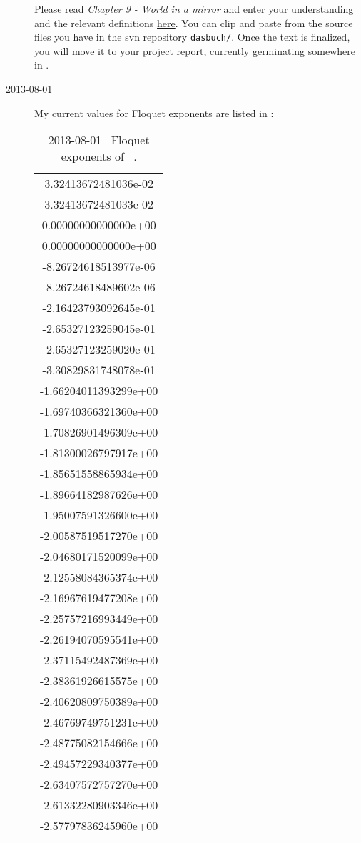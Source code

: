 \begin{description}
Please read
{\em Chapter 9 - World in a mirror} and enter your understanding and the
relevant definitions \underline{here}. You can clip and paste from
the source files you have in the svn repository \texttt{dasbuch/}. Once the text is
finalized, you will move it to your project report, currently germinating
somewhere in .

\item[2013-08-01 \XD]
My current values for Floquet exponents are listed in :

\begin{table}%
\caption{2013-08-01 \XD\ Floquet exponents of \po\ .}
\label{xiong_fe1025}
\begin{center}
\begin{tabular}{c}

   3.32413672481036e-02\\
   3.32413672481033e-02\\
   0.00000000000000e+00\\
   0.00000000000000e+00\\
  -8.26724618513977e-06\\
  -8.26724618489602e-06\\
  -2.16423793092645e-01\\
  -2.65327123259045e-01\\
  -2.65327123259020e-01\\
  -3.30829831748078e-01\\
  -1.66204011393299e+00\\
  -1.69740366321360e+00\\
  -1.70826901496309e+00\\
  -1.81300026797917e+00\\
  -1.85651558865934e+00\\
  -1.89664182987626e+00\\
  -1.95007591326600e+00\\
  -2.00587519517270e+00\\
  -2.04680171520099e+00\\
  -2.12558084365374e+00\\
  -2.16967619477208e+00\\
  -2.25757216993449e+00\\
  -2.26194070595541e+00\\
  -2.37115492487369e+00\\
  -2.38361926615575e+00\\
  -2.40620809750389e+00\\
  -2.46769749751231e+00\\
  -2.48775082154666e+00\\
  -2.49457229340377e+00\\
  -2.63407572757270e+00\\
  -2.61332280903346e+00\\
  -2.57797836245960e+00\\
\end{tabular}
\end{center}
\end{table}


\end{description}
